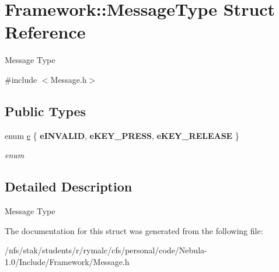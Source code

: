 \hypertarget{structFramework_1_1MessageType}{
\section{Framework::MessageType Struct Reference}
\label{structFramework_1_1MessageType}
}


Message Type  


{\ttfamily \#include $<$Message.h$>$}\subsection*{Public Types}
\begin{DoxyCompactItemize}
\item 
enum \hyperlink{structFramework_1_1MessageType_a038aebb683e6dfd07600bf40f6563d4a}{e} \{ {\bfseries eINVALID}, 
{\bfseries eKEY\_\-PRESS}, 
{\bfseries eKEY\_\-RELEASE}
 \}
\begin{DoxyCompactList}\small\item\em enum \item\end{DoxyCompactList}\end{DoxyCompactItemize}


\subsection{Detailed Description}
Message Type 

The documentation for this struct was generated from the following file:\begin{DoxyCompactItemize}
\item 
/nfs/stak/students/r/rymalc/cfs/personal/code/Nebula-\/1.0/Include/Framework/Message.h\end{DoxyCompactItemize}
